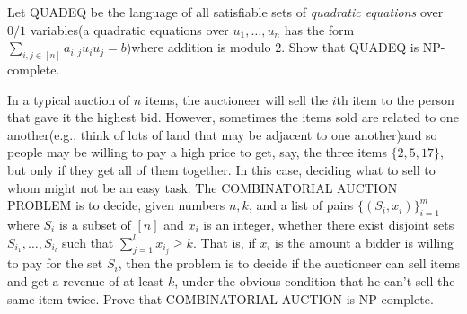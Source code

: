 \documentclass{article}
\newcounter{exercise}
\newcommand{\<}{
    \langle}
\renewcommand{\>}{
    \rangle}
\begin{document}
{\begin{exercise}
Let \textsf{QUADEQ} be the language of all satisfiable sets of \textit{quadratic equations} over $0/1$ variables(a quadratic equations over $u_1,\ldots,u_n$ has the form $\sum_{i,j\in[n]}a_{i,j}u_iu_j=b$)where addition is modulo $2$. Show that \textsf{QUADEQ} is NP-complete.
\end{exercise}

\begin{exercise}
In a typical auction of $n$ items, the auctioneer will sell the $i$th item to the person that gave it the highest bid. However, sometimes the items sold are related to one another(e.g., think of lots of land that may be adjacent to one another)and so people may be willing to pay a high price to get, say, the three items $\{2,5,17\}$, but only if they get all of them together. In this case, deciding what to sell to whom might not be an easy task. The \textsf{COMBINATORIAL AUCTION PROBLEM} is to decide, given numbers $n,k$, and a list of pairs $\{(S_i,x_i)\}^m_{i=1}$ where $S_i$ is a subset of $[n]$ and $x_i$ is an integer, whether there exist disjoint sets $S_{i_1},\ldots,S_{i_l}$ such that $\sum_{j=1}^lx_{i_j}\geq k$. That is, if $x_i$ is the amount a bidder is willing to pay for the set $S_i$, then the problem is to decide if the auctioneer can sell items and get a revenue of at least $k$, under the obvious condition that he can't sell the same item twice. Prove that \textsf{COMBINATORIAL AUCTION} is NP-complete.
\end{exercise}

} %
\end{document}

